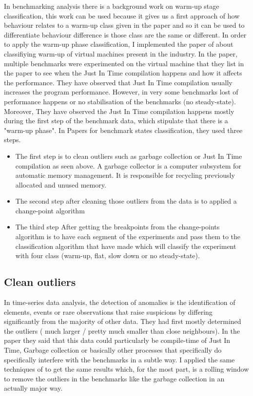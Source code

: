 \documentclass{article}
\begin{document}
In benchmarking analysis there is a background work on warm-up stage classification, this work can be used because it gives us a first approach of how behaviour relates to a warm-up class given in the paper and so it can be used to differentiate behaviour difference is those class are the same or different. In order to apply the warm-up phase classification, I implemented the paper of \citep{barrett2017virtual} about classifiying warm-up  of virtual machines present in the industry. 
In the paper, multiple benchmarks were experimented on the virtual machine that they list in the paper to see when the Just In Time compilation happens and how it affects the performance.
They have observed that Just In Time compilation usually increases the program performance. However, in very some benchmarks lost of performance happens or no stabilisation of the benchmarks (no steady-state). Moreover, They have observed the Just In Time compilation happens mostly during the first step of the benchmark data, which stipulate that there is a "warm-up phase".
In \citep{barrett2017virtual} Papers for benchmark states classification, they used three steps.

\begin{itemize}
    \item The first step is to clean outliers such as garbage collection or Just In Time compilation as seen above. A garbage collector is a computer subsystem for automatic memory management.  It is responsible for recycling previously allocated and unused memory.  
    \item The second step after cleaning those outliers from the data is to applied a change-point algorithm \citep{killick2014changepoint}
    \item The third step After getting the breakpoints from the change-points algorithm is to have each segment of the experiments and pass them to the classification algorithm that \citep{barrett2017virtual} have made which will classify the experiment with four class (warm-up, flat, slow down or no steady-state).
\end{itemize}




\subsection{Clean outliers}

In time-series data analysis, the detection of anomalies is the identification of elements, events or rare observations that raise suspicions by differing significantly from the majority of other data. They had first mostly determined the outliers ( much larger / pretty much smaller than close neighbours). In the paper \citep{barrett2017virtual} they said that this data could particularly be compile-time of Just In Time, Garbage collection or basically other processes that specifically do specifically interfere with the benchmarks in a subtle way. I applied the same techniques of \citep{barrett2017virtual} to get the same results which, for the most part, is a rolling window to remove the outliers in the benchmarks like the garbage collection in an actually major way.
\end{document}
